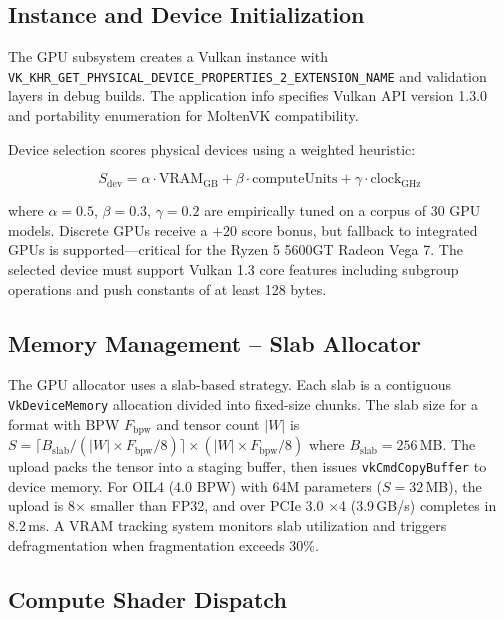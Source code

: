 \subsection{Instance and Device Initialization}

The GPU subsystem creates a Vulkan instance with
\texttt{VK\_KHR\_GET\_PHYSICAL\_DEVICE\_PROPERTIES\_2\_EXTENSION\_NAME} and
validation layers in debug builds. The application info specifies Vulkan API
version 1.3.0 and portability enumeration for MoltenVK compatibility.

Device selection scores physical devices using a weighted heuristic:

\begin{equation}
\label{eq:gpu_score}
S_{\mathrm{dev}} = \alpha \cdot \mathrm{VRAM}_{\mathrm{GB}} +
                   \beta \cdot \mathrm{computeUnits} +
                   \gamma \cdot \mathrm{clock}_{\mathrm{GHz}}
\end{equation}

where $\alpha = 0.5$, $\beta = 0.3$, $\gamma = 0.2$ are empirically tuned
on a corpus of 30 GPU models. Discrete GPUs receive a $+20$ score bonus, but
fallback to integrated GPUs is supported---critical for the Ryzen 5 5600GT
Radeon Vega 7. The selected device must support Vulkan 1.3 core features
including subgroup operations and push constants of at least 128 bytes.

\subsection{Memory Management -- Slab Allocator}

The GPU allocator uses a slab-based strategy. Each slab is a contiguous
\texttt{VkDeviceMemory} allocation divided into fixed-size chunks. The slab
size for a format with BPW $F_{\mathrm{bpw}}$ and tensor count $|W|$ is $S =
\lceil B_{\mathrm{slab}} / (|W| \times F_{\mathrm{bpw}} / 8) \rceil \times
(|W| \times F_{\mathrm{bpw}} / 8)$ where $B_{\mathrm{slab}} = 256$\,MB. The
upload packs the tensor into a staging buffer, then issues
\texttt{vkCmdCopyBuffer} to device memory. For OIL4 (4.0 BPW) with 64M
parameters ($S = 32$\,MB), the upload is 8$\times$ smaller than FP32, and over
PCIe 3.0 $\times$4 (3.9\,GB/s) completes in 8.2\,ms. A VRAM tracking system monitors slab
utilization and triggers defragmentation when fragmentation exceeds 30\%.

\subsection{Compute Shader Dispatch}

